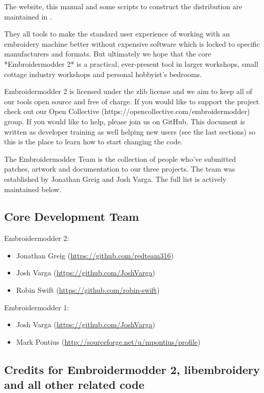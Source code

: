 \documentclass[a4paper]{report}
\begin{document}
The website, this manual and some scripts to construct the distribution are
maintained in \citep{thewebsite}.

They all tools to make the standard
user experience of working with an embroidery machine better without expensive
software which is locked to specific manufacturers and formats. But ultimately
we hope that the core *Embroidermodder 2* is a practical, ever-present tool in
larger workshops, small cottage industry workshops and personal hobbyist's
bedrooms.

Embroidermodder 2 is licensed under the zlib license and we aim to keep all of our tools open
source and free of charge. If you would like to support the project check out our  Open
Collective (https://opencollective.com/embroidermodder) group.
If you would like to help,
please join us on GitHub. This document is written as developer training as well helping new
users (see the last sections) so this is the place to learn how to start changing the code.

The Embroidermodder Team is the collection of people who've submitted
patches, artwork and documentation to our three projects.
The team was established by Jonathan Greig and Josh Varga.
The full list is actively maintained below.

\subsection{Core Development Team}

Embroidermodder 2:

\begin{itemize}
\item Jonathan Greig (\url{https://github.com/redteam316})
\item Josh Varga (\url{https://github.com/JoshVarga})
\item Robin Swift (\url{https://github.com/robin-swift})
\end{itemize}

Embroidermodder 1:

\begin{itemize}
\item Josh Varga (\url{https://github.com/JoshVarga})
\item Mark Pontius (\url{http://sourceforge.net/u/mpontius/profile})
\end{itemize}

\subsection{Credits for Embroidermodder 2, libembroidery and all other related code}
\end{document}
